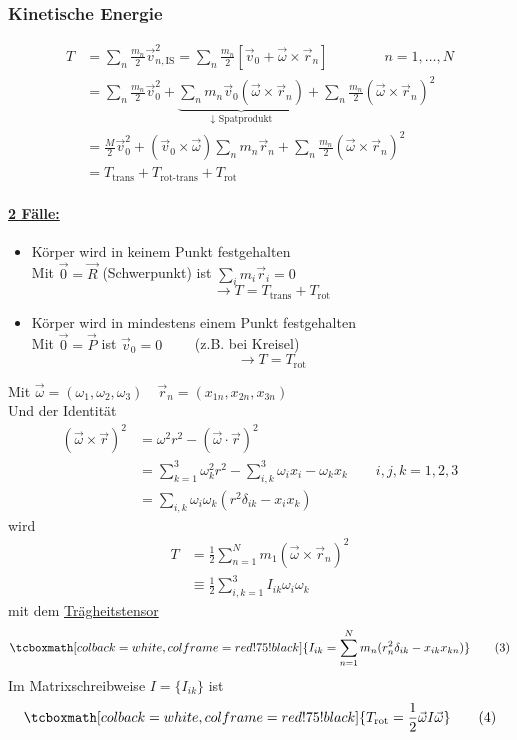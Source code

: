 \documentclass[titlepage,12pt,a4paper,ngerman]{report}
\newcommand{\tx}[1]{\textrm{#1}}
\newcommand{\ub}[1]{\underbrace{#1}}
\newcommand{\rmbox}[1]{\tcboxmath[colback=white,colframe=red!75!black]{#1}} %
\begin{document}
\subsubsection{Kinetische Energie}
\begin{align*}
T &= \sum_n \frac{m_n}{2} \vec{v}_{n,\tx{IS}}^2 = \sum_n \frac{m_n}{2} [\vec{v}_0 + \vec{\omega}\times \vec{r}_n] \qquad \qquad n = 1,\dots , N \\
&= \sum_n \frac{m_n}{2} \vec{v}_0^2 + \ub{\sum_n m_n \vec{v}_0 (\vec{\omega} \times \vec{r}_n)}_{\downarrow \tx{ Spatprodukt}} + \sum_n \frac{m_n}{2} (\vec{\omega} \times \vec{r}_n)^2 \\
&= \frac{M}{2} \vec{v}_0^2 + (\vec{v}_0 \times \vec{\omega}) \sum_n m_n \vec{r}_n + \sum_n \frac{m_n}{2} (\vec{\omega} \times \vec{r}_n)^2 \\
&= T_{\tx{trans}} + T_{\tx{rot-trans}} + T_{\tx{rot}} \tag{2}
\end{align*}
\paragraph{\underline{2 Fälle:}} 
\begin{itemize}
	\item Körper wird in keinem Punkt festgehalten\\
	Mit $ \vec{0} = \vec{R} $ (Schwerpunkt) ist $ \sum\limits_i m_i \vec{r}_i = 0 $
	$$ \rightarrow T = T_{\tx{trans}} + T_{\tx{rot}}$$
	\item Körper wird in mindestens einem Punkt festgehalten\\
	Mit $ \vec{0} = \vec{P} $ ist $ \vec{v}_0 = 0 \qquad $ (z.B. bei Kreisel) 
	$$ \rightarrow T = T_{\tx{rot}}$$
\end{itemize}
Mit $ \vec{\omega} = ( \omega_1,\omega_2,\omega_3) \quad \vec{r}_n = (x_{1n},x_{2n},x_{3n}) $\\
Und der Identität
\begin{align*}
(\vec{\omega} \times \vec{r})^2 &= \omega^2 r^2 - (\vec{\omega} \cdot \vec{r})^2\\
&= \sum_{k=1}^{3} \omega^2_k r^2 - \sum_{i,k}^{3} \omega_ix_i - \omega_k x_k \qquad i,j,k = 1,2,3\\
&= \sum_{i,k} \omega_i \omega_k (r^2 \delta_{ik} - x_i x_k)
\end{align*}
wird
\begin{align*}
T &= \frac{1}{2} \sum_{n=1}^{N} m_1 (\vec{\omega} \times \vec{r}_n)^2\\
&\equiv \frac{1}{2} \sum_{i,k = 1}^{3} I_{ik} \omega_i \omega_k
\end{align*}
mit dem \underline{Trägheitstensor}
\begin{equation*}
\rmbox{I_{ik} = \sum_{n=1}^{N} m_n (r_n^2 \delta_{ik} - x_{ik} x_{kn}) } \tag{3}
\end{equation*}
Im Matrixschreibweise $ I = \{I_{ik}\} $ ist
\begin{equation*}
\rmbox{T_{\tx{rot}} = \frac{1}{2} \vec{\omega} I \vec{\omega} } \tag{4}
\end{equation*}
\end{document}
